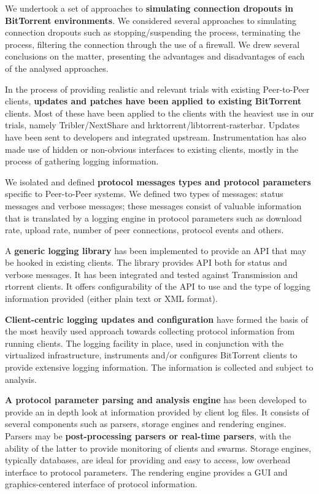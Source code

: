 We undertook a set of approaches to \textbf{simulating connection dropouts in
BitTorrent environments}. We considered several approaches to simulating
connection dropouts such as stopping/suspending the process, terminating the
process, filtering the connection through the use of a firewall. We drew
several conclusions on the matter, presenting the advantages and disadvantages
of each of the analysed approaches.

In the process of providing realistic and relevant trials with existing
Peer-to-Peer clients, \textbf{updates and patches have been applied to
existing BitTorrent} clients. Most of these have been applied to the clients
with the heaviest use in our trials, namely Tribler/NextShare and
hrktorrent/libtorrent-rasterbar. Updates have been sent to developers and
integrated upstream. Instrumentation has also made use of hidden or
non-obvious interfaces to existing clients, mostly in the process of gathering
logging information.

We isolated and defined \textbf{protocol messages types and protocol
parameters} specific to Peer-to-Peer systems. We defined two types of
messages: status messages and verbose messages; these messages consist of
valuable information that is translated by a logging engine in protocol
parameters such as download rate, upload rate, number of peer connections,
protocol events and others.

A \textbf{generic logging library} has been implemented to provide an API that
may be hooked in existing clients. The library provides API both for status
and verbose messages. It has been integrated and tested against Transmission
and rtorrent clients. It offers configurability of the API to use and the type
of logging information provided (either plain text or XML format).

\textbf{Client-centric logging updates and configuration} have formed the
basis of the most heavily used approach towards collecting protocol
information from running clients. The logging facility in place, used in
conjunction with the virtualized infrastructure, instruments and/or configures
BitTorrent clients to provide extensive logging information. The information
is collected and subject to analysis.

\textbf{A protocol parameter parsing and analysis engine} has been developed
to provide an in depth look at information provided by client log files. It
consists of several components such as parsers, storage engines and rendering
engines. Parsers may be \textbf{post-processing parsers or real-time parsers},
with the ability of the latter to provide monitoring of clients and swarms.
Storage engines, typically databases, are ideal for providing and easy to
access, low overhead interface to protocol parameters. The rendering engine
provides a GUI and graphics-centered interface of protocol information.

